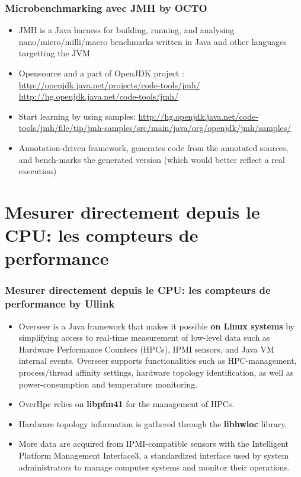 \documentclass[presentation]{beamer}
\begin{document}
\begin{frame}
\frametitle{Microbenchmarking avec JMH by OCTO}

\begin{itemize}
\item JMH is a Java harness for building, running, and analysing nano/micro/milli/macro benchmarks written in Java and other languages targetting the JVM
\item Opensource and a part of OpenJDK project :
\url{http://openjdk.java.net/projects/code-tools/jmh/}
\url{http://hg.openjdk.java.net/code-tools/jmh/}
\item Start learning by using samples:
\url{http://hg.openjdk.java.net/code-tools/jmh/file/tip/jmh-samples/src/main/java/org/openjdk/jmh/samples/}
\item Annotation-driven framework, generates code from the annotated sources, and bench-marks the generated version (which would better reflect a real execution)
\end{itemize}

\end{frame}

\section{Mesurer directement depuis le CPU: les compteurs de performance}

\begin{frame}
\frametitle{Mesurer directement depuis le CPU: les compteurs de performance by Ullink}

\begin{itemize}
\item Overseer is a Java framework that makes it possible \textbf{on Linux systems} by simplifying access to real-time measurement of low-level data such as Hardware Performance Counters (HPCs), IPMI sensors, and Java VM internal events. Overseer supports functionalities such as HPC-management, process/thread affinity settings, hardware topology identification, as well as power-consumption and temperature monitoring.
\item OverHpc relies on \textbf{libpfm41} for the management of HPCs.
\item Hardware topology information is gathered through the \textbf{libhwloc} library.
\item More data are acquired from IPMI-compatible sensors with the Intelligent Platform Management Interface3, a standardized interface used by system administrators to manage computer systems and monitor their operations.
\end{itemize}

\end{frame}
\end{document}
